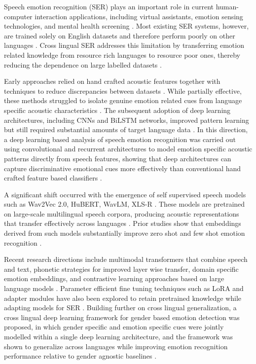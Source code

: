 \documentclass[runningheads]{llncs}
\begin{document}
Speech emotion recognition (SER) plays an important role in current human-computer interaction applications, including virtual assistants, emotion sensing technologies, and mental health screening \cite{b17}. Most existing SER systems, however, are trained solely on English datasets and therefore perform poorly on other languages \cite{b3,b4}. Cross lingual SER addresses this limitation by transferring emotion related knowledge from resource rich languages to resource poor ones, thereby reducing the dependence on large labelled datasets \cite{b8,b12}.

Early approaches relied on hand crafted acoustic features together with techniques to reduce discrepancies between datasets \cite{b9,b15}. While partially effective, these methods struggled to isolate genuine emotion related cues from language specific acoustic characteristics \cite{b7,b14}. The subsequent adoption of deep learning architectures, including CNNs and BiLSTM networks, improved pattern learning but still required substantial amounts of target language data \cite{b9,b13}. In this direction, a deep learning based analysis of speech emotion recognition was carried out using convolutional and recurrent architectures to model emotion specific acoustic patterns directly from speech features, showing that deep architectures can capture discriminative emotional cues more effectively than conventional hand crafted feature based classifiers \cite{b18}.

A significant shift occurred with the emergence of self supervised speech models such as Wav2Vec 2.0, HuBERT, WavLM, XLS-R \cite{b16,b27}. These models are pretrained on large-scale multilingual speech corpora, producing acoustic representations that transfer effectively across languages \cite{b16,b27}. Prior studies show that embeddings derived from such models substantially improve zero shot and few shot emotion recognition \cite{b11,b23}.

Recent research directions include multimodal transformers that combine speech and text, phonetic strategies for improved layer wise transfer, domain specific emotion embeddings, and contrastive learning approaches based on large language models \cite{b1,b3}. Parameter efficient fine tuning techniques such as LoRA and adapter modules have also been explored to retain pretrained knowledge while adapting models for SER \cite{b2}. Building further on cross lingual generalization, a cross lingual deep learning framework for gender based emotion detection was proposed, in which gender specific and emotion specific cues were jointly modelled within a single deep learning architecture, and the framework was shown to generalize across languages while improving emotion recognition performance relative to gender agnostic baselines \cite{b22}.
\end{document}
